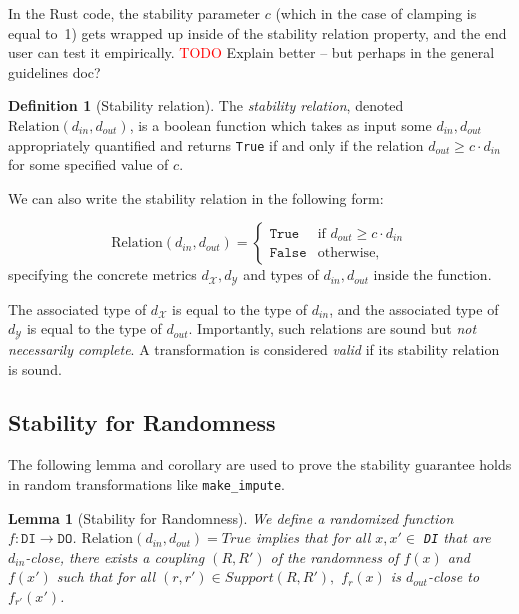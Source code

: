 \documentclass[11pt,a4paper]{article}
\newtheorem{lemma}{Lemma}[section]
\theoremstyle{definition}
\newtheorem{definition}{Definition}[section]
\newcommand{\din}{d_{in}}
\newcommand{\dout}{d_{out}}
\newcommand{\Relation}{\mathrm{Relation}}
\newcommand{\X}{\mathcal{X}}
\newcommand{\Y}{\mathcal{Y}}
\newcommand{\True}{\texttt{True}}
\newcommand{\False}{\texttt{False}}
\newcommand{\silvia}[1]{{ {\color{blue}{(silvia)~#1}}}}
\newcommand{\grace}[1]{{ {\color{purple}{(grace)~#1}}}}
\newcommand{\todo}{{\textcolor{red}{TODO }}}
\begin{document}
\silvia{Add a sentence saying that not all stability relations can be expressed only with $c$ (linear relationship).}

In the Rust code, the stability parameter $c$ (which in the case of clamping is equal to~1) gets wrapped up inside of the stability relation property, and the end user can test it empirically. \todo{Explain better -- but perhaps in the general guidelines doc?}

\begin{definition}[Stability relation]
    The \textit{stability relation}, denoted $\Relation(\din, \dout)$, is a boolean function which takes as input some $\din, \dout$ appropriately quantified and returns \texttt{True} if and only if the relation $\dout \geq c \cdot \din$ for some specified value of $c$. 
\end{definition}

We can also write the stability relation in the following form:

\begin{equation}
    \Relation(\din, \dout) = 
    \begin{cases} 
      \True & \textrm{if } \dout \geq c \cdot \din \\
      \False & \textrm{otherwise},
   \end{cases}
\end{equation}
specifying the concrete metrics $d_{\X}, d_{\Y}$ and types of $\din, \dout$ inside the function.

The associated type of $d_{\X}$ is equal to the type of $\din$, and the associated type of $d_{\Y}$ is equal to the type of $\dout$. Importantly, such relations are sound but \textit{not necessarily complete}. A transformation is considered \textit{valid} if its stability relation is sound.


\subsection{Stability for Randomness}


The following lemma and corollary are used to prove the stability guarantee holds in random transformations like \texttt{make\_impute}. 
\begin{lemma}[Stability for Randomness]
We define a randomized function $f: \texttt{DI} \rightarrow \texttt{DO}$. $\Relation(d_{in}, d_{out}) = True$ implies that for all $x, x' \in$ \texttt{DI} that are $d_{in}$-close, there exists a coupling $(R, R')$ of the randomness of $f(x)$ and $f(x')$ such that for all $(r, r') \in Support(R, R'),$ $f_r(x)$ is $d_{out}$-close to $f_{r'}(x')$.
\end{lemma}
\end{document}
